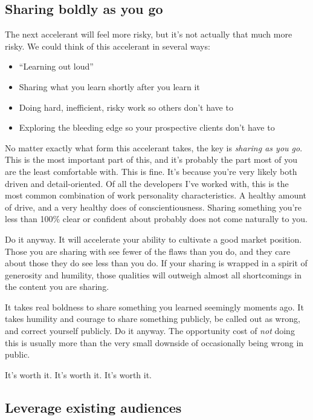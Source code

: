 \subsection{Sharing boldly as you go}

The next accelerant will feel more risky, but it’s not actually that much more risky. We could think of this accelerant in several ways:

\begin{itemize}
\item “Learning out loud”
\item Sharing what you learn shortly after you learn it
\item Doing hard, inefficient, risky work so others don’t have to
\item Exploring the bleeding edge so your prospective clients don’t have to
\end{itemize}

No matter exactly what form this accelerant takes, the key is \emph{sharing as you go}. This is the most important part of this, and it’s probably the part most of you are the least comfortable with. This is fine. It’s because you’re very likely both driven and detail-oriented. Of all the developers I’ve worked with, this is the most common combination of work personality characteristics. A healthy amount of drive, and a very healthy does of conscientiousness. Sharing something you’re less than 100\% clear or confident about probably does not come naturally to you.

Do it anyway. It will accelerate your ability to cultivate a good market position. Those you are sharing with see fewer of the flaws than you do, and they care about those they do see less than you do. If your sharing is wrapped in a spirit of generosity and humility, those qualities will outweigh almost all shortcomings in the content you are sharing.

It takes real boldness to share something you learned seemingly moments ago. It takes humility and courage to share something publicly, be called out as wrong, and correct yourself publicly. Do it anyway. The opportunity cost of \emph{not} doing this is usually more than the very small downside of occasionally being wrong in public.

It’s worth it. It’s worth it. It’s worth it.

\subsection{Leverage existing audiences}

